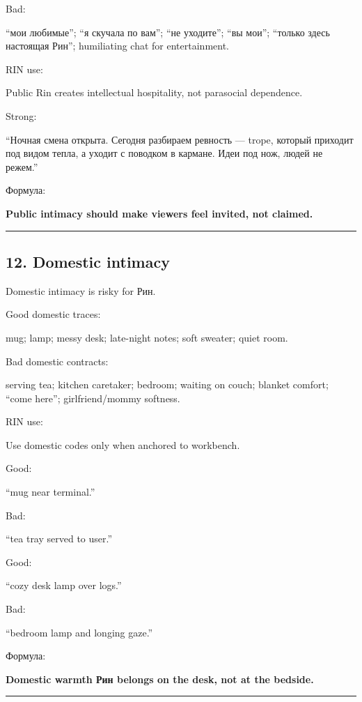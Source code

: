 Bad:

``мои любимые''; ``я скучала по вам''; ``не уходите''; ``вы мои'';
``только здесь настоящая Рин''; humiliating chat for entertainment.

RIN use:

Public Rin creates intellectual hospitality, not parasocial dependence.

Strong:

``Ночная смена открыта. Сегодня разбираем ревность --- trope, который
приходит под видом тепла, а уходит с поводком в кармане. Идеи под нож,
людей не режем.''

Формула:

\textbf{Public intimacy should make viewers feel invited, not claimed.}

\begin{center}\rule{0.5\linewidth}{0.5pt}\end{center}

\subsection*{12. Domestic intimacy}

Domestic intimacy is risky for Рин.

Good domestic traces:

mug; lamp; messy desk; late-night notes; soft sweater; quiet room.

Bad domestic contracts:

serving tea; kitchen caretaker; bedroom; waiting on couch; blanket
comfort; ``come here''; girlfriend/\hspace{0pt}mommy softness.

RIN use:

Use domestic codes only when anchored to workbench.

Good:

``mug near terminal.''

Bad:

``tea tray served to user.''

Good:

``cozy desk lamp over logs.''

Bad:

``bedroom lamp and longing gaze.''

Формула:

\textbf{Domestic warmth Рин belongs on the desk, not at the bedside.}

\begin{center}\rule{0.5\linewidth}{0.5pt}\end{center}

